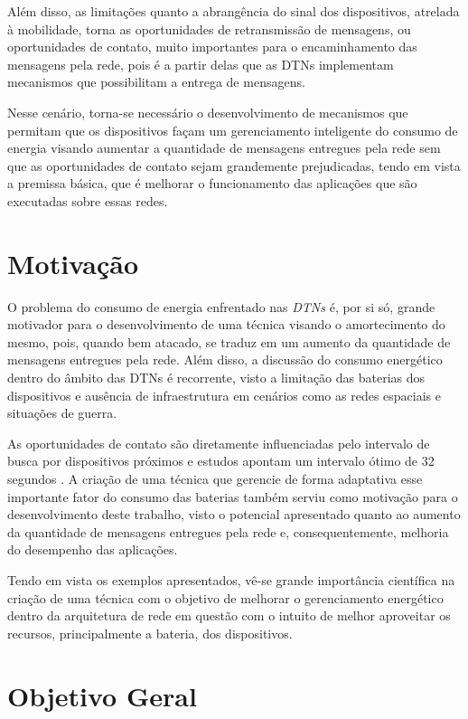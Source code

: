 Além disso, as limitações quanto a abrangência do sinal dos dispositivos, atrelada à mobilidade, torna as oportunidades de retransmissão de mensagens, ou oportunidades de contato, muito importantes para o encaminhamento das mensagens pela rede, pois é a partir delas que as DTNs implementam mecanismos que possibilitam a entrega de mensagens.

Nesse cenário, torna-se necessário o desenvolvimento de mecanismos que permitam que os dispositivos façam um gerenciamento inteligente do consumo de energia visando aumentar a quantidade de mensagens entregues pela rede sem que as oportunidades de contato sejam grandemente prejudicadas, tendo em vista a premissa básica, que é melhorar o funcionamento das aplicações que são executadas sobre essas redes.

\section{Motivação}\label{mot}

O problema do consumo de energia enfrentado nas \emph{DTNs} é, por si só, grande motivador para o desenvolvimento de uma técnica visando o amortecimento do mesmo, pois, quando bem atacado, se traduz em um aumento da quantidade de mensagens entregues pela rede. Além disso, a discussão do consumo energético dentro do âmbito das DTNs é recorrente, visto a limitação das baterias dos dispositivos e ausência de infraestrutura em cenários como as redes espaciais e situações de guerra.

As oportunidades de contato são diretamente influenciadas pelo intervalo de busca por dispositivos próximos e estudos apontam um intervalo ótimo de 32 segundos \cite{denis_artigo}. A criação de uma técnica que gerencie de forma adaptativa esse importante fator do consumo das baterias também serviu como motivação para o desenvolvimento deste trabalho, visto o potencial apresentado quanto ao aumento da quantidade de mensagens entregues pela rede e, consequentemente, melhoria do desempenho das aplicações.

Tendo em vista os exemplos apresentados, vê-se grande importância científica na criação de uma técnica com o objetivo de melhorar o gerenciamento energético dentro da arquitetura de rede em questão com o intuito de melhor aproveitar os recursos, principalmente a bateria, dos dispositivos.

\section{Objetivo Geral}\label{sec:objetivos_gerais}

